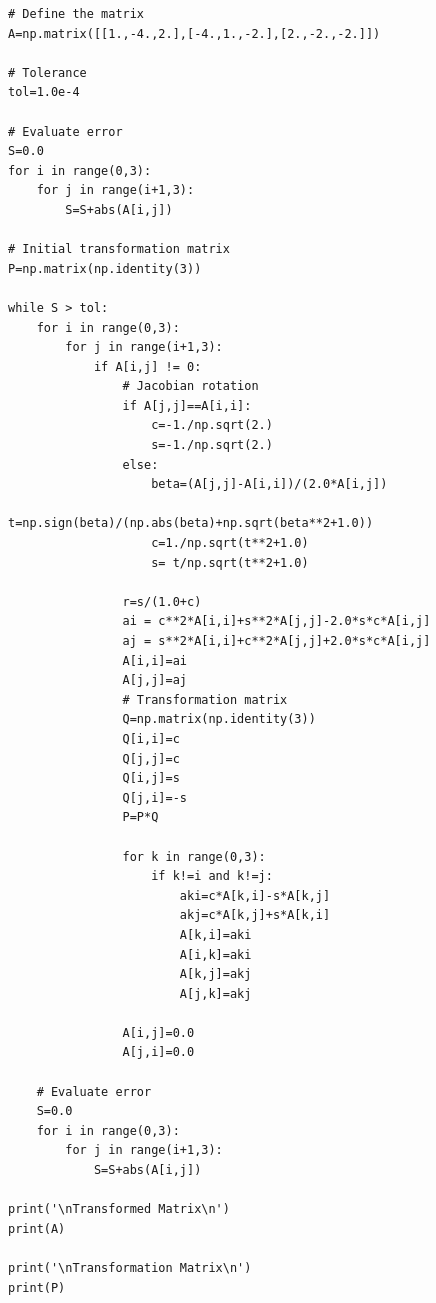 {\begin{verbatim}
# Define the matrix
A=np.matrix([[1.,-4.,2.],[-4.,1.,-2.],[2.,-2.,-2.]])

# Tolerance
tol=1.0e-4

# Evaluate error
S=0.0
for i in range(0,3):
    for j in range(i+1,3):
        S=S+abs(A[i,j])

# Initial transformation matrix
P=np.matrix(np.identity(3))

while S > tol:
    for i in range(0,3):
        for j in range(i+1,3):
            if A[i,j] != 0:
                # Jacobian rotation
                if A[j,j]==A[i,i]:
                    c=-1./np.sqrt(2.)
                    s=-1./np.sqrt(2.)
                else:
                    beta=(A[j,j]-A[i,i])/(2.0*A[i,j])
                    t=np.sign(beta)/(np.abs(beta)+np.sqrt(beta**2+1.0))
                    c=1./np.sqrt(t**2+1.0)
                    s= t/np.sqrt(t**2+1.0)

                r=s/(1.0+c)
                ai = c**2*A[i,i]+s**2*A[j,j]-2.0*s*c*A[i,j]
                aj = s**2*A[i,i]+c**2*A[j,j]+2.0*s*c*A[i,j]
                A[i,i]=ai
                A[j,j]=aj
                # Transformation matrix
                Q=np.matrix(np.identity(3))
                Q[i,i]=c
                Q[j,j]=c
                Q[i,j]=s
                Q[j,i]=-s
                P=P*Q

                for k in range(0,3):
                    if k!=i and k!=j:
                        aki=c*A[k,i]-s*A[k,j]
                        akj=c*A[k,j]+s*A[k,i]
                        A[k,i]=aki
                        A[i,k]=aki
                        A[k,j]=akj
                        A[j,k]=akj

                A[i,j]=0.0
                A[j,i]=0.0

    # Evaluate error
    S=0.0
    for i in range(0,3):
        for j in range(i+1,3):
            S=S+abs(A[i,j])

print('\nTransformed Matrix\n')
print(A)

print('\nTransformation Matrix\n')
print(P)
\end{verbatim}
\normalsize


}
